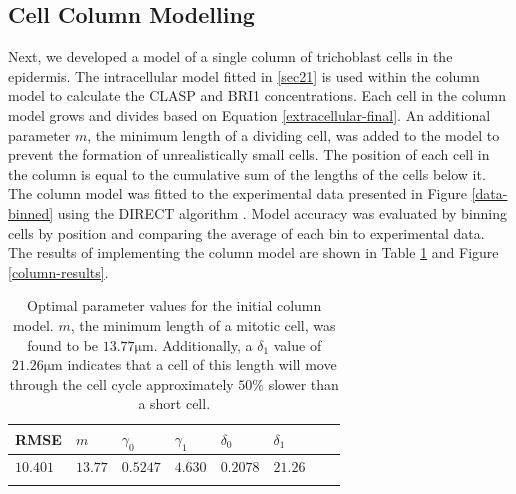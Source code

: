 \documentclass[referee,pdflatex,sn-mathphys-num]{sn-jnl}
\newcommand{\um}{\unit{\micro\metre}}
\begin{document}
\subsection{Cell Column Modelling}

Next, we developed a model of a single column of trichoblast cells in the epidermis.
The intracellular model fitted in \ref{sec21} is used within the column model to calculate the CLASP and BRI1 concentrations.
Each cell in the column model grows and divides based on Equation \eqref{extracellular-final}.
An additional parameter $m$, the minimum length of a dividing cell, was added to the model to prevent the formation of unrealistically small cells.
The position of each cell in the column is equal to the cumulative sum of the lengths of the cells below it.
The column model was fitted to the experimental data presented in Figure \ref{data-binned} using the DIRECT algorithm \cite{jones1993}.
Model accuracy was evaluated by binning cells by position and comparing the average of each bin to experimental data.
The results of implementing the column model are shown in Table \ref{column-fits} and Figure \ref{column-results}.

\begin{table}[ht]
\caption{Optimal parameter values for the initial column model.
$m$, the minimum length of a mitotic cell, was found to be $13.77\um$. 
Additionally, a $\delta_{1}$ value of $21.26\um$ indicates that a cell of this length will move through the cell cycle approximately $50\%$ slower than a short cell. }
\label{column-fits}
\begin{tabular}{@{}llllllll@{}}
\toprule
RMSE & $m$ & $\gamma_{0}$ & $\gamma_{1}$ & $\delta_{0}$ & $\delta_{1}$ \\
\midrule
$10.401$ & $13.77$ & $0.5247$ & $4.630$ & $0.2078$ & $21.26$\\
\botrule
\end{tabular}
\end{table}
\end{document}

